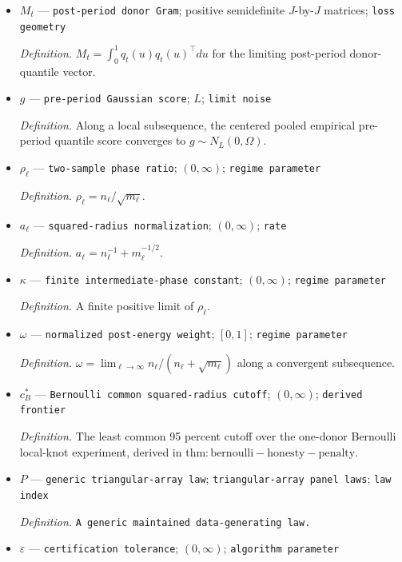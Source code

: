 \documentclass{article}
\begin{document}
\begin{itemize}
  \item \(M_t\) --- \texttt{post-\allowbreak{}period donor Gram}; positive semidefinite \(J\)-by-\(J\) matrices; \texttt{loss geometry}
  \par\smallskip\noindent\emph{Definition.} \(M_t=\int_0^1q_t(u)q_t(u)^\top du\) for the limiting post-period donor-quantile vector.
  \item \(g\) --- \texttt{pre-\allowbreak{}period Gaussian score}; \(L\); \texttt{limit noise}
  \par\smallskip\noindent\emph{Definition.} Along a local subsequence, the centered pooled empirical pre-period quantile score converges to \(g\sim N_L(0,\Omega)\).
  \item \(\rho_\ell\) --- \texttt{two-\allowbreak{}sample phase ratio}; \((0,\infty)\); \texttt{regime parameter}
  \par\smallskip\noindent\emph{Definition.} \(\rho_\ell=n_\ell/\sqrt{m_\ell}\).
  \item \(a_\ell\) --- \texttt{squared-\allowbreak{}radius normalization}; \((0,\infty)\); \texttt{rate}
  \par\smallskip\noindent\emph{Definition.} \(a_\ell=n_\ell^{-1}+m_\ell^{-1/2}\).
  \item \(\kappa\) --- \texttt{finite intermediate-\allowbreak{}phase constant}; \((0,\infty)\); \texttt{regime parameter}
  \par\smallskip\noindent\emph{Definition.} A finite positive limit of \(\rho_\ell\).
  \item \(\omega\) --- \texttt{normalized post-\allowbreak{}energy weight}; \([0,1]\); \texttt{regime parameter}
  \par\smallskip\noindent\emph{Definition.} \(\omega=\lim_{\ell\to\infty}n_\ell/(n_\ell+\sqrt{m_\ell})\) along a convergent subsequence.
  \item \(c_B^*\) --- \texttt{Bernoulli common squared-\allowbreak{}radius cutoff}; \((0,\infty)\); \texttt{derived frontier}
  \par\smallskip\noindent\emph{Definition.} The least common 95 percent cutoff over the one-donor Bernoulli local-knot experiment, derived in \(\mathrm{thm:bernoulli-honesty-penalty}\).
  \item \(P\) --- \texttt{generic triangular-\allowbreak{}array law}; \texttt{triangular-\allowbreak{}array panel laws}; \texttt{law index}
  \par\smallskip\noindent\emph{Definition.} \texttt{A generic maintained data-\allowbreak{}generating law.}
  \item \(\varepsilon\) --- \texttt{certification tolerance}; \((0,\infty)\); \texttt{algorithm parameter}

\end{itemize}
\end{document}
